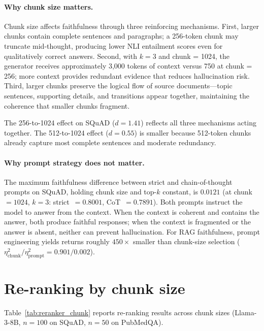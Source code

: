 \paragraph{Why chunk size matters.} Chunk size affects faithfulness
through three reinforcing mechanisms. First, larger chunks contain
complete sentences and paragraphs; a 256-token chunk may truncate
mid-thought, producing lower NLI entailment scores even for qualitatively
correct answers. Second, with $k = 3$ and chunk = 1024, the generator
receives approximately 3,000 tokens of context versus 750 at chunk = 256;
more context provides redundant evidence that reduces hallucination
risk. Third, larger chunks preserve the logical flow of source
documents---topic sentences, supporting details, and transitions appear
together, maintaining the coherence that smaller chunks fragment.

The 256-to-1024 effect on SQuAD ($d = 1.41$) reflects all three
mechanisms acting together. The 512-to-1024 effect ($d = 0.55$) is
smaller because 512-token chunks already capture most complete sentences
and moderate redundancy.

\paragraph{Why prompt strategy does not matter.} The maximum
faithfulness difference between strict and chain-of-thought prompts on
SQuAD, holding chunk size and top-$k$ constant, is $0.0121$
(at chunk~$=1024$, $k=3$: strict~$=0.8001$, CoT~$=0.7891$). Both prompts
instruct the model to answer from the context. When the context is
coherent and contains the answer, both produce faithful responses; when
the context is fragmented or the answer is absent, neither can prevent
hallucination. For RAG faithfulness, prompt engineering yields returns
roughly $450\times$ smaller than chunk-size selection
($\eta^2_{\text{chunk}} / \eta^2_{\text{prompt}} = 0.901 / 0.002$).

\FloatBarrier
\section{Re-ranking by chunk size}
\label{app:reranking}

Table~\ref{tab:reranker_chunk} reports re-ranking results across chunk
sizes (Llama-3-8B, $n = 100$ on SQuAD, $n = 50$ on PubMedQA).

